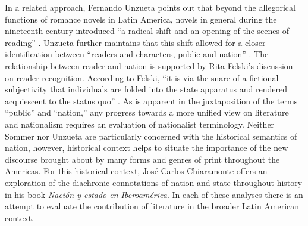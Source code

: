 \documentclass[12pt]{report}
\begin{document}
In a related approach, Fernando Unzueta points out that beyond the allegorical functions of romance novels in Latin America, novels in general during the nineteenth century introduced \enquote{a radical shift and an opening of the scenes of reading} \autocite*[78]{Unzueta2002}. 
Unzueta further maintains that this shift allowed for a closer identification between \enquote{readers and characters, public and nation} \autocite*[78]{Unzueta2002}. 
The relationship between reader and nation is supported by Rita Felski's discussion on reader recognition. 
According to Felski, \enquote{it is via the snare of a fictional subjectivity that individuals are folded into the state apparatus and rendered acquiescent to the status quo} \autocite*[27]{Felski2008}. 
As is apparent in the juxtaposition of the terms \enquote{public} and \enquote{nation,} any progress towards a more unified view on literature and nationalism requires an evaluation of nationalist terminology. Neither Sommer nor Unzueta are particularly concerned with the historical semantics of nation, however, historical context helps to situate the importance of the new discourse brought about by many forms and genres of print throughout the Americas. 
For this historical context, José Carlos Chiaramonte offers an exploration of the diachronic connotations of nation and state throughout history in his book \textit{Nación y estado en Iberoamérica}\nocite{Chiaramonte2004}. In each of these analyses there is an attempt to evaluate the contribution of literature in the broader Latin American context.
\end{document}
